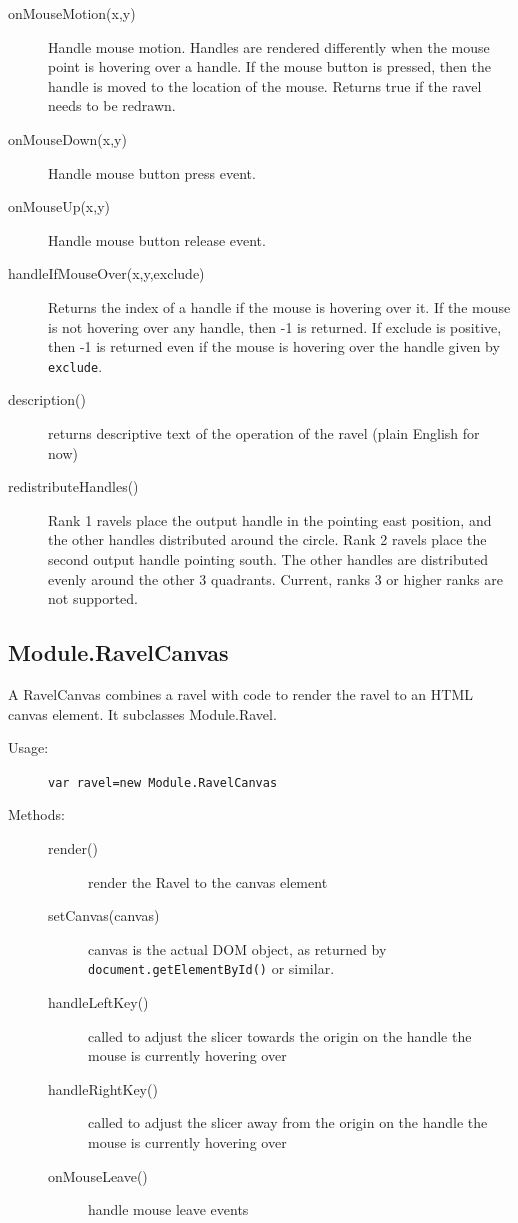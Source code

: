 \documentclass{article}
\begin{document}
\begin{description}
\begin{description}
  \item[onMouseMotion(x,y)] Handle mouse motion. Handles are rendered
    differently when the mouse point is hovering over a
    handle. If the mouse button is pressed, then the handle is moved
    to the location of the mouse. Returns true if the ravel needs to be redrawn.
  \item[onMouseDown(x,y)] Handle mouse button press event.
  \item[onMouseUp(x,y)] Handle mouse button release event.
    
  \item[handleIfMouseOver(x,y,exclude)] Returns the index of a handle if
    the mouse is hovering over it. If the mouse is not hovering over any
    handle, then -1 is returned. If exclude is positive, then -1 is
    returned even if the mouse is hovering over the handle given by {\tt
      exclude}.

  \item[description()] returns descriptive text of the operation of the
    ravel (plain English for now)
    
  \item[redistributeHandles()] Rank 1 ravels place the output handle in
    the pointing east position, and the other handles distributed around
    the circle. Rank 2 ravels place the second output handle pointing
    south. The other handles are distributed evenly around the other 3
    quadrants. Current, ranks 3 or higher ranks are not supported.
    
  \end{description} 
\end{description} 

\subsection{Module.RavelCanvas}

A RavelCanvas combines a ravel with code to render the ravel to an
HTML canvas element. It subclasses Module.Ravel.

\begin{description}
\item[Usage:] \verb+var ravel=new Module.RavelCanvas+

\item[Methods:]\mbox{}
\begin{description}
\item[render()] render the Ravel to the canvas element
\item[setCanvas(canvas)] canvas is the actual DOM object, as returned
  by {\tt document.getElementById()} or similar.
\item[handleLeftKey()] called to adjust the slicer towards the origin
  on the handle the mouse is currently hovering over
\item[handleRightKey()] called to adjust the slicer away from the origin
  on the handle the mouse is currently hovering over
\item[onMouseLeave()] handle mouse leave events
\end{description}
\end{description}
\end{document}
